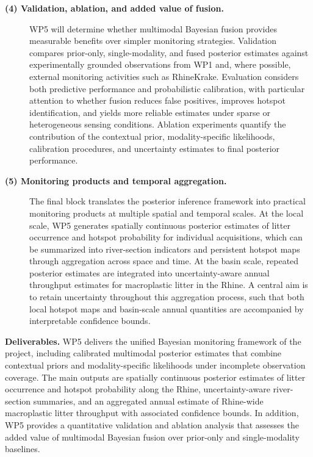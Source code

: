 \documentclass{scrartcl}
\begin{document}
\begin{description}
    \item[\textbf{(4) Validation, ablation, and added value of fusion.}] WP5 will determine whether multimodal Bayesian fusion provides measurable benefits over simpler monitoring strategies. Validation compares prior-only, single-modality, and fused posterior estimates against experimentally grounded observations from WP1 and, where possible, external monitoring activities such as RhineKrake. Evaluation considers both predictive performance and probabilistic calibration, with particular attention to whether fusion reduces false positives, improves hotspot identification, and yields more reliable estimates under sparse or heterogeneous sensing conditions. Ablation experiments quantify the contribution of the contextual prior, modality-specific likelihoods, calibration procedures, and uncertainty estimates to final posterior performance.

    \item[\textbf{(5) Monitoring products and temporal aggregation.}] The final block translates the posterior inference framework into practical monitoring products at multiple spatial and temporal scales. At the local scale, WP5 generates spatially continuous posterior estimates of litter occurrence and hotspot probability for individual acquisitions, which can be summarized into river-section indicators and persistent hotspot maps through aggregation across space and time. At the basin scale, repeated posterior estimates are integrated into uncertainty-aware annual throughput estimates for macroplastic litter in the Rhine. A central aim is to retain uncertainty throughout this aggregation process, such that both local hotspot maps and basin-scale annual quantities are accompanied by interpretable confidence bounds.
\end{description}

\textbf{Deliverables.} WP5 delivers the unified Bayesian monitoring framework of the project, including calibrated multimodal posterior estimates that combine contextual priors and modality-specific likelihoods under incomplete observation coverage. The main outputs are spatially continuous posterior estimates of litter occurrence and hotspot probability along the Rhine, uncertainty-aware river-section summaries, and an aggregated annual estimate of Rhine-wide macroplastic litter throughput with associated confidence bounds. In addition, WP5 provides a quantitative validation and ablation analysis that assesses the added value of multimodal Bayesian fusion over prior-only and single-modality baselines.
\end{document}
